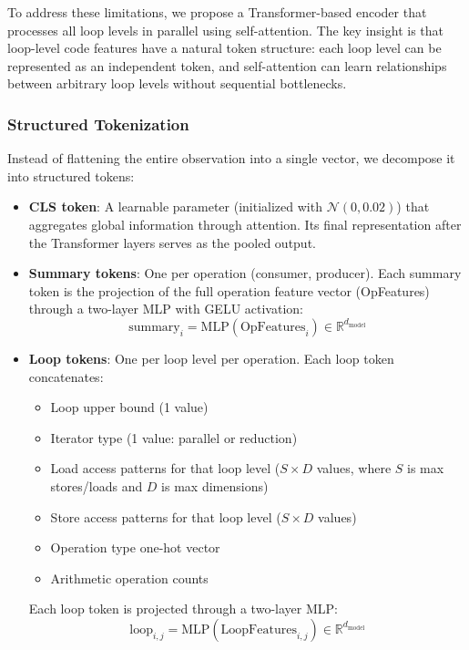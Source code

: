 \documentclass[10pt,twocolumn]{article}
\begin{document}
To address these limitations, we propose a Transformer-based encoder that processes all loop levels in parallel using self-attention. The key insight is that loop-level code features have a natural token structure: each loop level can be represented as an independent token, and self-attention can learn relationships between arbitrary loop levels without sequential bottlenecks.

\subsubsection{Structured Tokenization}

Instead of flattening the entire observation into a single vector, we decompose it into structured tokens:

\begin{itemize}
\item \textbf{CLS token}: A learnable parameter (initialized with $\mathcal{N}(0, 0.02)$) that aggregates global information through attention. Its final representation after the Transformer layers serves as the pooled output.

\item \textbf{Summary tokens}: One per operation (consumer, producer). Each summary token is the projection of the full operation feature vector (OpFeatures) through a two-layer MLP with GELU activation:
\begin{equation}
\text{summary}_i = \text{MLP}(\text{OpFeatures}_i) \in \mathbb{R}^{d_{\text{model}}}
\end{equation}

\item \textbf{Loop tokens}: One per loop level per operation. Each loop token concatenates:
  \begin{itemize}
  \item Loop upper bound (1 value)
  \item Iterator type (1 value: parallel or reduction)
  \item Load access patterns for that loop level ($S \times D$ values, where $S$ is max stores/loads and $D$ is max dimensions)
  \item Store access patterns for that loop level ($S \times D$ values)
  \item Operation type one-hot vector
  \item Arithmetic operation counts
  \end{itemize}
  Each loop token is projected through a two-layer MLP:
\begin{equation}
\text{loop}_{i,j} = \text{MLP}(\text{LoopFeatures}_{i,j}) \in \mathbb{R}^{d_{\text{model}}}
\end{equation}
\end{itemize}
\end{document}
